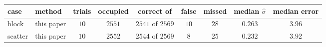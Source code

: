 \begin{center}
\footnotesize
\begin{tabular}{llccccccc}
case & method & trials & occupied & correct of & false & missed & median $\hat\sigma$ & median error \\
\hline
block & this paper & $10$ & $2551$ & $2541$ of $2569$ & $10$ & $28$ & $0.263$ & $3.96$ \\
\hline
scatter & this paper & $10$ & $2552$ & $2544$ of $2569$ & $8$ & $25$ & $0.232$ & $3.92$ \\
\end{tabular}
\end{center}
